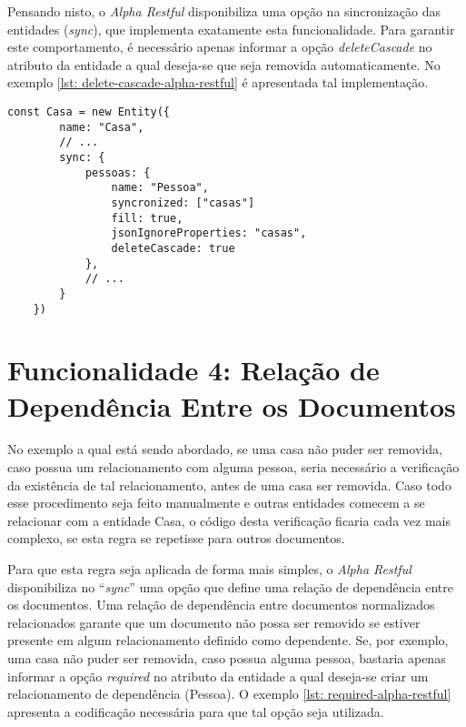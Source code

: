 Pensando nisto, o \textit{Alpha Restful} disponibiliza uma opção na sincronização das entidades (\textit{sync}), que implementa exatamente esta funcionalidade. Para garantir este comportamento, é necessário apenas informar a opção \textit{deleteCascade} no atributo da entidade a qual deseja-se que seja removida automaticamente. No exemplo \ref{lst: delete-cascade-alpha-restful} é apresentada tal implementação.

\begin{lstlisting}[style=ES6, caption={Modelagem de ``Casa'' com \textit{deleteCascade}\label{lst: delete-cascade-alpha-restful}}]
    const Casa = new Entity({
        name: "Casa",
        // ...
        sync: {
            pessoas: {
                name: "Pessoa",
                syncronized: ["casas"]
                fill: true,
                jsonIgnoreProperties: "casas",
                deleteCascade: true
            },
            // ...
        }
    })
\end{lstlisting}

\section{Funcionalidade 4: Relação de Dependência Entre os Documentos\label{section: relacao-dependencia-entre-documentos}}

No exemplo a qual está sendo abordado, se uma casa não puder ser removida, caso possua um relacionamento com alguma pessoa, seria necessário a verificação da existência de tal relacionamento, antes de uma casa ser removida. Caso todo esse procedimento seja feito manualmente e outras entidades comecem a se relacionar com a entidade Casa, o código desta verificação ficaria cada vez mais complexo, se esta regra se repetisse para outros documentos.

Para que esta regra seja aplicada de forma mais simples, o \textit{Alpha Restful} disponibiliza no ``\textit{sync}'' uma opção que define uma relação de dependência entre os documentos. Uma relação de dependência entre documentos normalizados relacionados garante que um documento não possa ser removido se estiver presente em algum relacionamento definido como dependente. Se, por exemplo, uma casa não puder ser removida, caso possua alguma pessoa, bastaria apenas informar a opção \textit{required} no atributo da entidade a qual deseja-se criar um relacionamento de dependência (Pessoa). O exemplo \ref{lst: required-alpha-restful} apresenta a codificação necessária para que tal opção seja utilizada.

